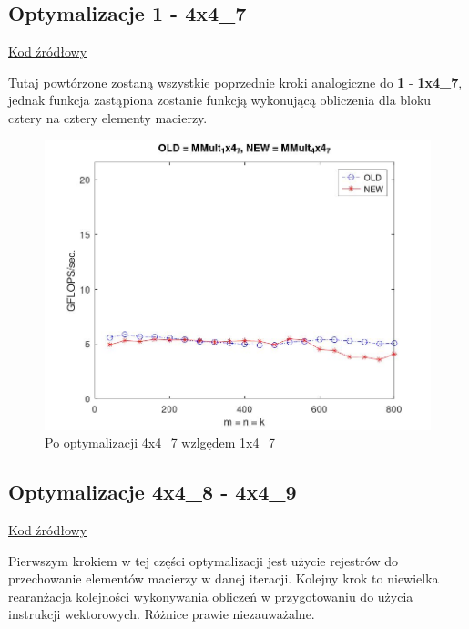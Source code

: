 \documentclass{article}
\begin{document}
\subsection{Optymalizacje 1 - 4x4\_7}

\href{https://github.com/flame/how-to-optimize-gemm/blob/master/src/MMult_4x4_7.c}{Kod źródłowy}

Tutaj powtórzone zostaną wszystkie poprzednie kroki analogiczne do \textbf{1} - \textbf{1x4\_7},
jednak funkcja  zastąpiona zostanie funkcją  wykonującą
obliczenia dla bloku cztery na cztery elementy macierzy.

\begin{figure}[H]
    \centering
    \includegraphics[width=1.0\textwidth]{figure5.jpg}
    \caption{Po optymalizacji 4x4\_7 wzlgędem 1x4\_7}
\end{figure}

\subsection{Optymalizacje 4x4\_8 - 4x4\_9}

\href{https://github.com/flame/how-to-optimize-gemm/blob/master/src/MMult_4x4_9.c}{Kod źródłowy}

Pierwszym krokiem w tej części optymalizacji jest użycie rejestrów do przechowanie elementów
macierzy  w danej iteracji. Kolejny krok to niewielka rearanżacja kolejności
wykonywania obliczeń w przygotowaniu do użycia instrukcji wektorowych. Różnice prawie niezauważalne.
\end{document}
